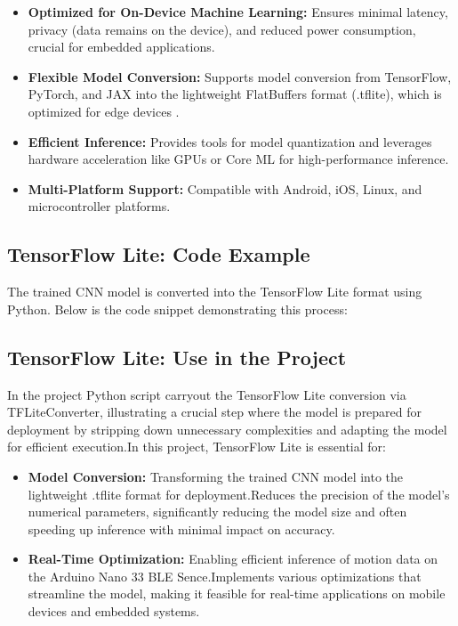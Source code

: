 \begin{itemize}
    \item \textbf{Optimized for On-Device Machine Learning:} Ensures minimal latency, privacy (data remains on the device), and reduced power consumption, crucial for embedded applications\cite{GoogleLiteRT:2023}.
    \item \textbf{Flexible Model Conversion:} Supports model conversion from TensorFlow, PyTorch, and JAX into the lightweight FlatBuffers format (.tflite), which is optimized for edge devices \cite{GoogleLiteRT:2023}.
    \item \textbf{Efficient Inference:} Provides tools for model quantization and leverages hardware acceleration like GPUs or Core ML for high-performance inference.
    \item \textbf{Multi-Platform Support:} Compatible with Android, iOS, Linux, and microcontroller platforms\cite{GoogleLiteRT:2023}.
\end{itemize}

\subsection{TensorFlow Lite: Code Example}
The trained CNN model is converted into the TensorFlow Lite format using Python. Below is the code snippet demonstrating this process:

\lstset{style=pythonstyle}



\subsection{TensorFlow Lite: Use in the Project}
In the project Python script carryout  the TensorFlow Lite conversion via TFLiteConverter, illustrating a crucial step where the model is prepared for deployment by stripping down unnecessary complexities and adapting the model for efficient execution.In this project, TensorFlow Lite is essential for:
\begin{itemize}
    \item \textbf{Model Conversion:} Transforming the trained CNN model into the lightweight .tflite format for deployment.Reduces the precision of the model’s numerical parameters, significantly reducing the model size and often speeding up inference with minimal impact on accuracy\cite{GoogleLiteRT:2023}.
    \item \textbf{Real-Time Optimization:} Enabling efficient inference of motion data on the Arduino Nano 33 BLE Sence.Implements various optimizations that streamline the model, making it feasible for real-time applications on mobile devices and embedded systems\cite{ArduinoNano33Sense2025}.
   
\end{itemize}

